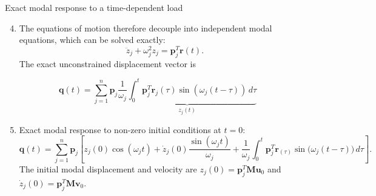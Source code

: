 \documentclass[aspectratio=169]{beamer}
\begin{document}
\begin{frame}{Exact modal response to a time-dependent load}
  \small \begin{enumerate}
    \setcounter{enumi}{3}
    \item The equations of motion therefore decouple into independent modal equations, which can be solved exactly:
          \[
            \ddot z_j+\omega_j^2 z_j=\mathbf p_j^T\mathbf r(t).
          \]
          The exact unconstrained displacement vector is
  \end{enumerate}
  \begin{tcolorbox}[colback=darkred!10,colframe=darkred!40!black]
    $$\mathbf q(t)=\sum_{j=1}^{n}\mathbf p_j\underbrace{ \frac{1}{\omega_j}\int_0^t \mathbf p^T_j\mathbf r_{j}(\tau)\sin(\omega_j(t-\tau))\, d\tau }_{z_j(t)}$$
  \end{tcolorbox}
  \small \begin{enumerate}
    \setcounter{enumi}{4}
    \item Exact modal response to non-zero initial conditions at $t=0$:
          \[
            \mathbf q(t)
            =\sum_{j=1}^{n}\mathbf p_j\left[
              z_j(0)\cos(\omega_j t)
              +\dot z_j(0)\frac{\sin(\omega_j t)}{\omega_j}
              +\frac{1}{\omega_j}\int_0^t
              \mathbf p_j^T\mathbf r_(\tau)
              \sin\bigl(\omega_j(t-\tau)\bigr)\,d\tau
              \right].
          \]
          The initial modal displacement and velocity are
          $z_j(0)=\mathbf p_j^T\mathbf M\mathbf u_{0}$ and
          $\dot z_j(0)=\mathbf p_j^T\mathbf M\mathbf v_{0}$.
  \end{enumerate}

\end{frame}
\end{document}
